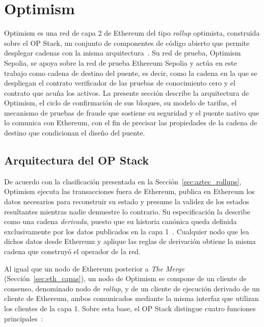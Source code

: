 \section{Optimism}
\label{sec:optimism}

Optimism es una red de capa 2 de Ethereum del tipo \textit{rollup} optimista, construida sobre
el OP Stack, un conjunto de componentes de código abierto que permite desplegar cadenas con la
misma arquitectura~\cite{opstackoverview}. Su red de prueba, Optimism Sepolia, se apoya sobre la
red de prueba Ethereum Sepolia y actúa en este trabajo como cadena de destino del puente, es decir,
como la cadena en la que se despliegan el contrato verificador de las pruebas de conocimiento
cero y el contrato que acuña los activos. La presente sección describe la arquitectura de
Optimism, el ciclo de confirmación de sus bloques, su modelo de tarifas, el mecanismo de pruebas
de fraude que sostiene su seguridad y el puente nativo que lo comunica con Ethereum, con el fin
de precisar las propiedades de la cadena de destino que condicionan el diseño del puente.

\subsection{Arquitectura del OP Stack}
\label{sec:op_arquitectura}

De acuerdo con la clasificación presentada en la Sección~\ref{sec:aztec_rollups}, Optimism
ejecuta las transacciones fuera de Ethereum, publica en Ethereum los datos necesarios para
reconstruir su estado y presume la validez de los estados resultantes mientras nadie demuestre lo
contrario. Su especificación la describe como una cadena \textit{derivada}, puesto que su
historia canónica queda definida exclusivamente por los datos publicados en la capa
1~\cite{opstackoverview}. Cualquier nodo que lea dichos datos desde Ethereum y aplique las reglas
de derivación obtiene la misma cadena que construyó el operador de la red.

Al igual que un nodo de Ethereum posterior a \textit{The Merge} (Sección~\ref{sec:eth_capas}), un
nodo de Optimism se compone de un cliente de consenso, denominado nodo de \textit{rollup}, y de un
cliente de ejecución derivado de un cliente de Ethereum, ambos comunicados mediante la misma
interfaz que utilizan los clientes de la capa 1. Sobre esta base, el OP Stack distingue cuatro
funciones principales~\cite{opstackoverview}:

